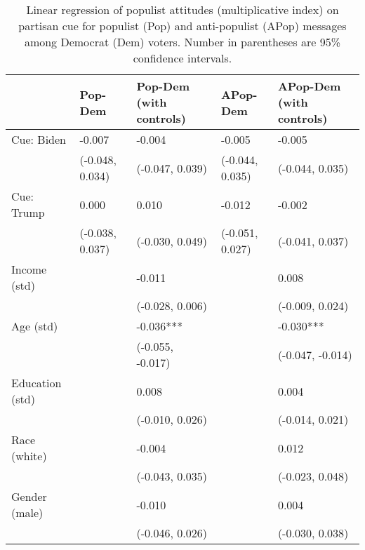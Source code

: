 \begin{table}[th!]
\centering
\caption{Linear regression of populist attitudes (multiplicative index) on partisan cue for populist (Pop) and anti-populist (APop) messages among Democrat (Dem) voters. Number in parentheses are 95\% confidence intervals.}
\label{tab-reg-dem-popmul.tex}
\begin{threeparttable}
\begin{tabular}{lC{3cm}C{3cm}C{3cm}C{3cm}}
\toprule
                &         Pop-Dem & Pop-Dem (with controls) &        APop-Dem & APop-Dem (with controls) \\
\midrule
     Cue: Biden &          -0.007 &                  -0.004 &          -0.005 &                   -0.005 \\
                & (-0.048, 0.034) &         (-0.047, 0.039) & (-0.044, 0.035) &          (-0.044, 0.035) \\
     Cue: Trump &           0.000 &                   0.010 &          -0.012 &                   -0.002 \\
                & (-0.038, 0.037) &         (-0.030, 0.049) & (-0.051, 0.027) &          (-0.041, 0.037) \\
   Income (std) &                 &                  -0.011 &                 &                    0.008 \\
                &                 &         (-0.028, 0.006) &                 &          (-0.009, 0.024) \\
      Age (std) &                 &               -0.036*** &                 &                -0.030*** \\
                &                 &        (-0.055, -0.017) &                 &         (-0.047, -0.014) \\
Education (std) &                 &                   0.008 &                 &                    0.004 \\
                &                 &         (-0.010, 0.026) &                 &          (-0.014, 0.021) \\
   Race (white) &                 &                  -0.004 &                 &                    0.012 \\
                &                 &         (-0.043, 0.035) &                 &          (-0.023, 0.048) \\
  Gender (male) &                 &                  -0.010 &                 &                    0.004 \\
                &                 &         (-0.046, 0.026) &                 &          (-0.030, 0.038) \\

\end{tabular}
\end{threeparttable}
\end{table}

